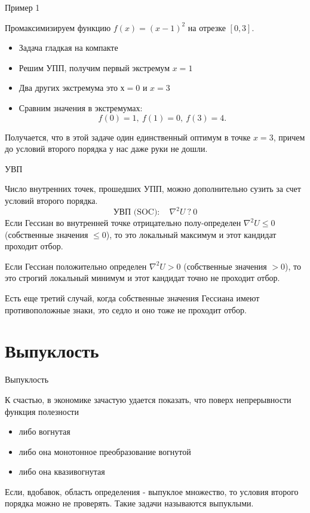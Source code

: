 \documentclass{beamer}
\begin{document}
\begin{frame}{Пример 1}

Промаксимизируем функцию $f(x) = (x-1)^2$ на отрезке $[0,3]$.

\begin{itemize}
  \item Задача гладкая на компакте
  \item Решим УПП, получим первый экстремум $x = 1$
  \item Два других экстремума это $х = 0$ и $x = 3$
  \item Сравним значения в экстремумах: $$f(0) = 1, \ f(1) = 0, \ f(3) = 4.$$
\end{itemize}

Получается, что в этой задаче один единственный оптимум в точке $x = 3$, причем до условий второго порядка у нас даже руки не дошли.

\end{frame}

\begin{frame}{УВП}

Число внутренних точек, прошедших УПП, можно дополнительно сузить за счет условий второго порядка.
$$\text{УВП (SOC)}: \quad  \nabla^2 U \ ? \ 0$$
Если Гессиан во внутренней точке отрицательно полу-определен $\nabla^2 U \leqslant 0$ (собственные значения $\leqslant 0$), то это \alert{локальный максимум} и этот кандидат проходит отбор.

Если Гессиан положительно определен $\nabla^2 U > 0$ (собственные значения $>0$), то это строгий \alert{локальный минимум} и этот кандидат точно не проходит отбор.

Есть еще третий случай, когда собственные значения Гессиана имеют противоположные знаки, это \alert{седло} и оно тоже не проходит отбор.

\end{frame}

\section{Выпуклость}

\begin{frame}{Выпуклость}

К счастью, в экономике зачастую удается показать, что поверх непрерывности функция полезности

\begin{itemize}
\item либо вогнутая
\item либо она монотонное преобразование вогнутой
\item либо она квазивогнутая
\end{itemize}

Если, вдобавок, область определения - выпуклое множество, то условия второго порядка можно не проверять. Такие задачи называются \alert{выпуклыми}.

\end{frame}
\end{document}
